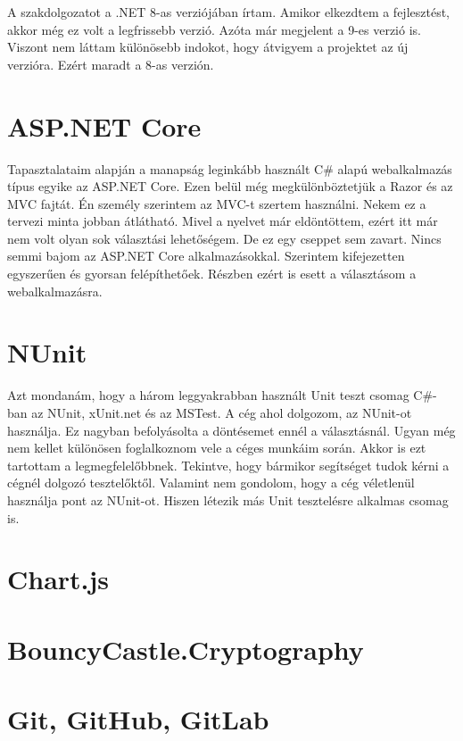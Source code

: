 \documentclass[12pt]{report} %
\begin{document}
A szakdolgozatot a .NET 8-as verziójában írtam. Amikor elkezdtem a fejlesztést, akkor még ez volt a legfrissebb verzió. Azóta már megjelent a 9-es verzió is. Viszont nem láttam különösebb indokot, hogy átvigyem a projektet az új verzióra. Ezért maradt a 8-as verzión.

\section{ASP.NET Core} %

Tapasztalataim alapján a manapság leginkább használt C\# alapú webalkalmazás típus egyike az ASP.NET Core. Ezen belül még megkülönböztetjük a Razor és az MVC fajtát. Én személy szerintem az MVC-t szertem használni. Nekem ez a tervezi minta jobban átlátható. Mivel a nyelvet már eldöntöttem, ezért itt már nem volt olyan sok választási lehetőségem. De ez egy cseppet sem zavart. Nincs semmi bajom az ASP.NET Core alkalmazásokkal. Szerintem kifejezetten egyszerűen és gyorsan felépíthetőek. Részben ezért is esett a választásom a webalkalmazásra.

\section{NUnit} %

Azt mondanám, hogy a három leggyakrabban használt Unit teszt csomag C\#-ban az NUnit, xUnit.net és az MSTest. A cég ahol dolgozom, az NUnit-ot használja. Ez nagyban befolyásolta a döntésemet ennél a választásnál. Ugyan még nem kellet különösen foglalkoznom vele a céges munkáim során. Akkor is ezt tartottam a legmegfelelőbbnek. Tekintve, hogy bármikor segítséget tudok kérni a cégnél dolgozó tesztelőktől. Valamint nem gondolom, hogy a cég véletlenül használja pont az NUnit-ot. Hiszen létezik más Unit tesztelésre alkalmas csomag is.

\section{Chart.js} %

\section{BouncyCastle.Cryptography} %

\section{Git, GitHub, GitLab} %
\end{document}
